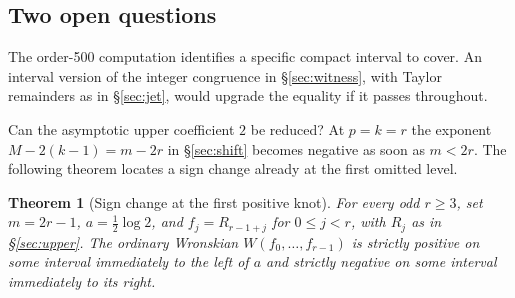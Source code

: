\documentclass[11pt,a4paper,reqno]{amsart}
\newtheorem{theorem}{Theorem}[section]
\numberwithin{equation}{section}
\begin{document}
\subsection{Two open questions}

The order-500 computation identifies a specific compact interval to cover. An interval version of the integer congruence in \S\ref{sec:witness}, with Taylor remainders as in \S\ref{sec:jet}, would upgrade the equality if it passes throughout.

Can the asymptotic upper coefficient \(2\) be reduced? At \(p=k=r\) the exponent \(M-2(k-1)=m-2r\) in \S\ref{sec:shift} becomes negative as soon as \(m<2r\). The following theorem locates a sign change already at the first omitted level.

\begin{theorem}[Sign change at the first positive knot]\label{th:firstknot}
For every odd \(r\ge3\), set \(m=2r-1\), \(a=\tfrac12\log2\), and \(f_j=R_{r-1+j}\) for \(0\le j<r\), with \(R_j\) as in \S\ref{sec:upper}. The ordinary Wronskian \(W(f_0,\ldots,f_{r-1})\) is strictly positive on some interval immediately to the left of \(a\) and strictly negative on some interval immediately to its right.
\end{theorem}
\end{document}
